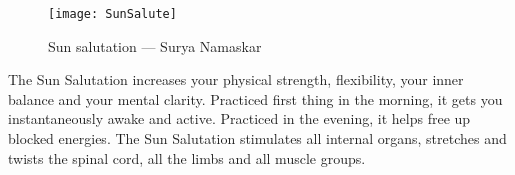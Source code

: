 \documentclass[../Book.Stress_regulation.tex]{subfiles}
\begin{document}
\label{Ex:SunSalutation}
\begin{figure}[htb!]
\texttt{[image: SunSalute]}\label{sf:yoga}
\caption{Sun salutation --- Surya Namaskar}
\end{figure}


The Sun Salutation increases your physical strength, flexibility, your inner balance and your mental clarity.
Practiced first thing in the morning, it gets you instantaneously awake and active.
Practiced in the evening, it helps free up blocked energies.
The Sun Salutation stimulates all internal organs, stretches and twists the spinal cord, all the limbs and all muscle groups.
\end{document}
